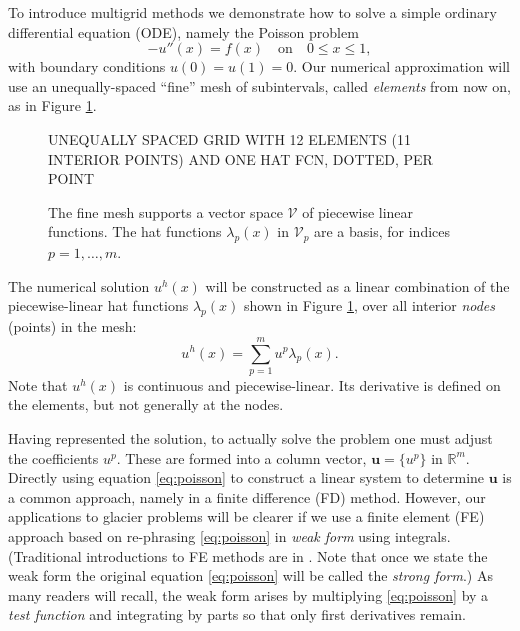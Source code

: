 \documentclass[letterpaper,final,12pt,reqno]{amsart}
\newcommand{\RR}{\mathbb{R}}
\newcommand{\bu}{\mathbf{u}}
\begin{document}
To introduce multigrid methods we demonstrate how to solve a simple ordinary differential equation (ODE), namely the Poisson problem
\begin{equation}
- u''(x) = f(x) \quad \text{on} \quad 0 \le x \le 1, \label{eq:poisson}
\end{equation}
with boundary conditions $u(0)=u(1)=0$.  Our numerical approximation will use an unequally-spaced ``fine'' mesh of subintervals, called \emph{elements} from now on, as in Figure \ref{fig:finehats}.

\begin{figure}
UNEQUALLY SPACED GRID WITH 12 ELEMENTS (11 INTERIOR POINTS) AND ONE HAT FCN, DOTTED, PER POINT
\caption{The fine mesh supports a vector space $\mathcal{V}$ of piecewise linear functions.  The hat functions $\lambda_p(x)$ in $\mathcal{V}_p$ are a basis, for indices $p=1,\dots,m$.}
\label{fig:finehats}
\end{figure}

The numerical solution $u^h(x)$ will be constructed as a linear combination of the piecewise-linear hat functions $\lambda_p(x)$ shown in Figure \ref{fig:finehats}, over all interior \emph{nodes} (points) in the mesh:
\begin{equation}
u^h(x) = \sum_{p=1}^m u^p \lambda_p(x). \label{eq:trialsolution}
\end{equation}
Note that $u^h(x)$ is continuous and piecewise-linear.  Its derivative is defined on the elements, but not generally at the nodes.

Having represented the solution, to actually solve the problem one must adjust the coefficients $u^p$.  These are formed into a column vector, $\bu=\{u^p\}$ in $\RR^m$.  Directly using equation \eqref{eq:poisson} to construct a linear system to determine $\bu$ is a common approach, namely in a finite difference (FD) method.  However, our applications to glacier problems will be clearer if we use a finite element (FE) approach based on re-phrasing \eqref{eq:poisson} in \emph{weak form} using integrals.  (Traditional introductions to FE methods are in \cite{Bueler2021,Elmanetal2014}.  Note that once we state the weak form the original equation \eqref{eq:poisson} will be called the \emph{strong form}.)  As many readers will recall, the weak form arises by multiplying \eqref{eq:poisson} by a \emph{test function} and integrating by parts so that only first derivatives remain.
\end{document}
